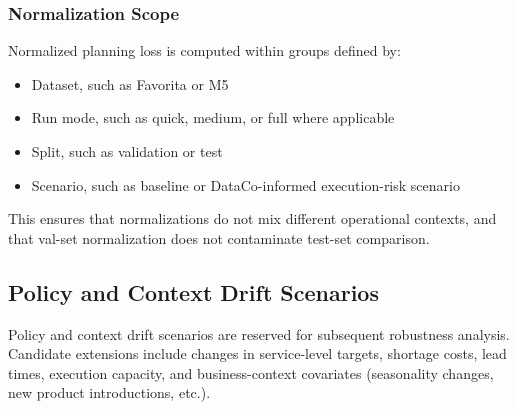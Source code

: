 \subsubsection{Normalization Scope}

Normalized planning loss is computed within groups defined by:
\begin{itemize}
    \item Dataset, such as Favorita or M5
    \item Run mode, such as quick, medium, or full where applicable
    \item Split, such as validation or test
    \item Scenario, such as baseline or DataCo-informed execution-risk scenario
\end{itemize}

This ensures that normalizations do not mix different operational contexts, and that val-set normalization does not contaminate test-set comparison.

\subsection{Policy and Context Drift Scenarios}

Policy and context drift scenarios are reserved for subsequent robustness analysis. Candidate extensions include changes in service-level targets, shortage costs, lead times, execution capacity, and business-context covariates (seasonality changes, new product introductions, etc.).
